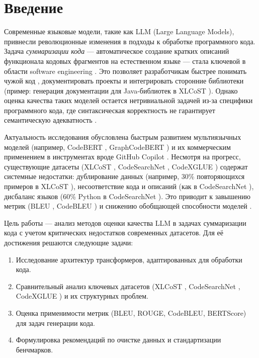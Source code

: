 \documentclass[14pt]{article}
\theoremstyle{definition}
\begin{document}
\tableofcontents
\newpage
\section{Введение}

Современные языковые модели, такие как LLM (Large Language Models), привнесли революционные изменения в подходы к обработке программного кода. Задача \textit{суммаризации кода} — автоматическое создание кратких описаний функционала кодовых фрагментов на естественном языке — стала ключевой в области software engineering \cite{chen2023}. Это позволяет разработчикам быстрее понимать чужой код \cite{husain2019codesearchnet}, документировать проекты \cite{zhu2022} и интегрировать сторонние библиотеки (пример: генерация документации для Java-библиотек в XLCoST \cite{xlcost_repo}). Однако оценка качества таких моделей остается нетривиальной задачей из-за специфики программного кода, где синтаксическая корректность не гарантирует семантическую адекватность \cite{ren2021}.

Актуальность исследования обусловлена быстрым развитием мультиязычных моделей (например, CodeBERT \cite{feng2020codebert}, GraphCodeBERT \cite{guo2021graphcodebert}) и их коммерческим применением в инструментах вроде GitHub Copilot \cite{copilot}. Несмотря на прогресс, существующие датасеты (XLCoST \cite{zhu2022}, CodeSearchNet \cite{husain2019codesearchnet}, CodeXGLUE \cite{lu2021codexglue}) содержат системные недостатки: дублирование данных (например, 30\% повторяющихся примеров в XLCoST \cite{xlcost_repo}), несоответствие кода и описаний (как в CodeSearchNet \cite{codesearchnet_repo}), дисбаланс языков (60\% Python в CodeSearchNet \cite{husain2019codesearchnet}). Это приводит к завышению метрик (BLEU \cite{zhang2020}, CodeBLEU \cite{ren2021}) и снижению обобщающей способности моделей \cite{feng2023}.

Цель работы — анализ методов оценки качества LLM в задачах суммаризации кода с учетом критических недостатков современных датасетов. Для её достижения решаются следующие задачи:
\begin{enumerate}
    \item Исследование архитектур трансформеров, адаптированных для обработки кода.
    \item Сравнительный анализ ключевых датасетов (XLCoST \cite{zhu2022}, CodeSearchNet \cite{husain2019codesearchnet}, CodeXGLUE \cite{lu2021codexglue}) и их структурных проблем.
    \item Оценка применимости метрик (BLEU, ROUGE, CodeBLEU, BERTScore) для задач генерации кода.
    \item Формулировка рекомендаций по очистке данных и стандартизации бенчмарков.
\end{enumerate}
\end{document}
